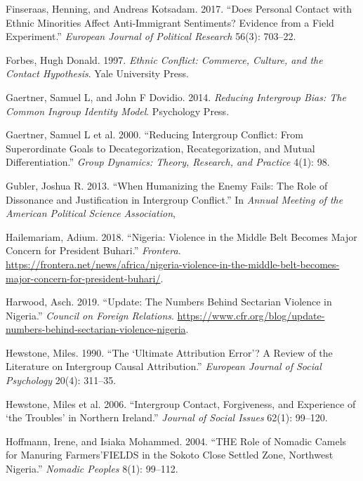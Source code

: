 \documentclass[11pt]{article}
\begin{document}
\leavevmode\hypertarget{ref-finseraas2017does}{}%
Finseraas, Henning, and Andreas Kotsadam. 2017. ``Does Personal Contact
with Ethnic Minorities Affect Anti-Immigrant Sentiments? Evidence from a
Field Experiment.'' \emph{European Journal of Political Research} 56(3):
703--22.

\leavevmode\hypertarget{ref-forbes1997ethnic}{}%
Forbes, Hugh Donald. 1997. \emph{Ethnic Conflict: Commerce, Culture, and
the Contact Hypothesis}. Yale University Press.

\leavevmode\hypertarget{ref-gaertner2014reducing}{}%
Gaertner, Samuel L, and John F Dovidio. 2014. \emph{Reducing Intergroup
Bias: The Common Ingroup Identity Model}. Psychology Press.

\leavevmode\hypertarget{ref-gaertner2000reducing}{}%
Gaertner, Samuel L et al. 2000. ``Reducing Intergroup Conflict: From
Superordinate Goals to Decategorization, Recategorization, and Mutual
Differentiation.'' \emph{Group Dynamics: Theory, Research, and Practice}
4(1): 98.

\leavevmode\hypertarget{ref-gubler2013humanizing}{}%
Gubler, Joshua R. 2013. ``When Humanizing the Enemy Fails: The Role of
Dissonance and Justification in Intergroup Conflict.'' In \emph{Annual
Meeting of the American Political Science Association},

\leavevmode\hypertarget{ref-frontera2018nigeria}{}%
Hailemariam, Adium. 2018. ``Nigeria: Violence in the Middle Belt Becomes
Major Concern for President Buhari.'' \emph{Frontera}.
\url{https://frontera.net/news/africa/nigeria-violence-in-the-middle-belt-becomes-major-concern-for-president-buhari/}.

\leavevmode\hypertarget{ref-council2019nigeria}{}%
Harwood, Asch. 2019. ``Update: The Numbers Behind Sectarian Violence in
Nigeria.'' \emph{Council on Foreign Relations}.
\url{https://www.cfr.org/blog/update-numbers-behind-sectarian-violence-nigeria}.

\leavevmode\hypertarget{ref-hewstone1990ultimate}{}%
Hewstone, Miles. 1990. ``The `Ultimate Attribution Error'? A Review of
the Literature on Intergroup Causal Attribution.'' \emph{European
Journal of Social Psychology} 20(4): 311--35.

\leavevmode\hypertarget{ref-hewstone2006intergroup}{}%
Hewstone, Miles et al. 2006. ``Intergroup Contact, Forgiveness, and
Experience of `the Troubles' in Northern Ireland.'' \emph{Journal of
Social Issues} 62(1): 99--120.

\leavevmode\hypertarget{ref-hoffmann2004role}{}%
Hoffmann, Irene, and Isiaka Mohammed. 2004. ``THE Role of Nomadic Camels
for Manuring Farmers'FIELDS in the Sokoto Close Settled Zone, Northwest
Nigeria.'' \emph{Nomadic Peoples} 8(1): 99--112.
\end{document}
